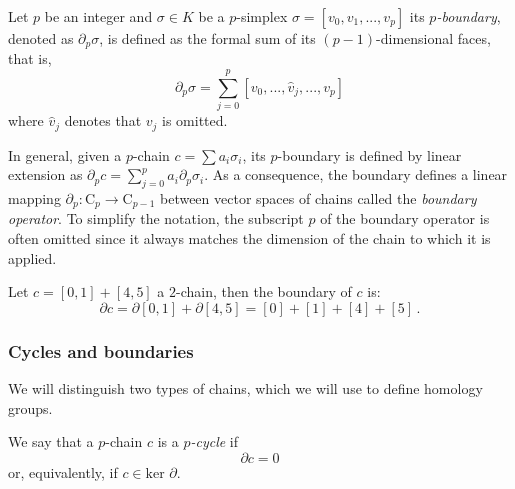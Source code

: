 \documentclass[../main.tex]{subfiles}
\begin{document}
\begin{definition}
Let $p$ be an integer and $\sigma \in K$ be a $p$-simplex ${\sigma = [v_0, v_1, ..., v_p]}$ its \emph{$p$-boundary}, denoted as $\partial_p\sigma$,  is defined as the formal sum of its $(p-1)$-dimensional faces, that is,    
\[
\partial_p\sigma = \sum_{j=0}^{p}[v_0, ..., \hat{v}_j, ..., v_p]
\]
where $\hat{v}_j$ denotes that $v_j$ is omitted.
\end{definition}

In general, given a $p$-chain $c =\sum a_i\sigma_i$, its $p$-boundary is defined by linear extension as $\partial_p c= \sum_{j=0}^{p} a_i \partial_p \sigma_i $. As a consequence, the boundary defines a linear mapping $\partial_p: \text{C}_p \to \text{C}_{p-1}$ between vector spaces of chains called the \emph{boundary operator}. To simplify the notation, the subscript $p$ of the boundary operator is often omitted since it always matches the dimension of the chain to which it is applied.


\begin{exmp}
Let $c = [0,1] + [4,5]$ a $2$-chain, then the boundary of $c$ is:
\[
\partial c = \partial [0,1] + \partial [4,5] = [0] + [1] + [4] + [5]\,.
\]
\end{exmp}

\subsubsection*{Cycles and boundaries}
We will distinguish two types of chains, which we will use to define homology groups.
\begin{definition}
We say that a $p$-chain $c$ is a \emph{$p$-cycle} if
\[
\partial c = 0
\]
or, equivalently, if $c \in \text{ker }\partial$.
\end{definition}
\end{document}
